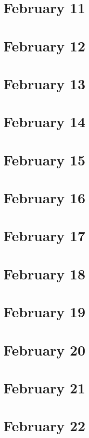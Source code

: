 \section{February 11}

\section{February 12}

\section{February 13}

\section{February 14}

\section{February 15}

\section{February 16}

\section{February 17}

\section{February 18}

\section{February 19}

\section{February 20}

\section{February 21}

\section{February 22}

